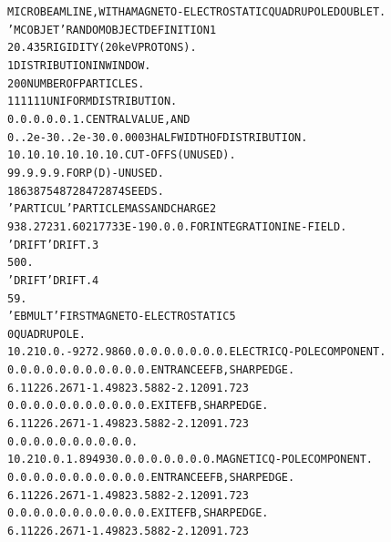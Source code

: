 \begin{tiny}
\begin{center}
\begin{alltt}
  MICROBEAM LINE, WITH A MAGNETO-ELECTROSTATIC QUADRUPOLE DOUBLET.                    
  'MCOBJET'                                     RANDOM  OBJECT  DEFINITION      1      
  20.435                                        RIGIDITY (20keV  PROTONS).     
  1                                             DISTRIBUTION IN WINDOW.        
  200                                           NUMBER  OF  PARTICLES.         
  1    1     1    1     1    1                  UNIFORM DISTRIBUTION.          
  0.   0.    0.   0.    0.   1.                 CENTRAL  VALUE,  AND           
  0.  .2e-3  0.  .2e-3  0.   0.0003             HALF WIDTH OF DISTRIBUTION.    
  10.  10.   10.  10.   10.  10.                CUT-OFFS (UNUSED).             
  9   9. 9. 9. 9.                               FOR P(D) - UNUSED.             
  186387 548728 472874                          SEEDS.                         
   'PARTICUL'                                   PARTICLE MASS AND CHARGE        2      
    938.2723 1.60217733E-19 0. 0. 0.              FOR INTEGRATION IN E-FIELD.    
  'DRIFT'                                       DRIFT.                          3      
  500.                                                                           
  'DRIFT'                                       DRIFT.                          4      
  59.                                                                            
  'EBMULT'                                      FIRST MAGNETO-ELECTROSTATIC     5      
   0                                                            QUADRUPOLE.      
  10.2  10. 0. -9272.986  0. 0. 0. 0. 0. 0. 0. 0.     ELECTRIC Q-POLE COMPONENT. 
   0.  0.  0.  0.  0.  0.  0.  0. 0. 0. 0.            ENTRANCE EFB, SHARP EDGE.  
  6  .1122 6.2671 -1.4982 3.5882 -2.1209 1.723                                   
   0.  0.  0.  0.  0.  0.  0.  0. 0. 0. 0.            EXIT EFB, SHARP EDGE.      
  6  .1122 6.2671 -1.4982 3.5882 -2.1209 1.723                                   
   0. 0. 0. 0. 0. 0. 0. 0. 0. 0.                                                 
  10.2  10. 0.  1.89493  0. 0. 0. 0.  0. 0. 0. 0.     MAGNETIC Q-POLE COMPONENT. 
   0.  0.  0.  0.  0.  0.  0.  0. 0. 0. 0.            ENTRANCE EFB, SHARP EDGE.  
  6  .1122 6.2671 -1.4982 3.5882 -2.1209 1.723                                   
   0.  0.  0.  0.  0.  0.  0.   0. 0. 0. 0.           EXIT EFB, SHARP EDGE.      
  6  .1122 6.2671 -1.4982 3.5882 -2.1209 1.723                                   

\end{alltt}
\end{center}
\end{tiny}
